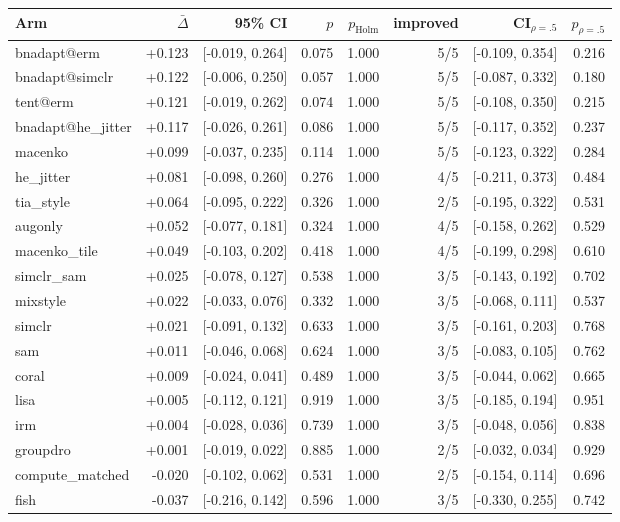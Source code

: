 \begin{tabular}{lrrrrrrr}
\toprule
Arm & $\bar\Delta$ & 95\% CI & $p$ & $p_\text{Holm}$ & improved & CI$_{\rho=.5}$ & $p_{\rho=.5}$ \\
\midrule
bnadapt@erm & +0.123 & [-0.019, 0.264] & 0.075 & 1.000 & 5/5 & [-0.109, 0.354] & 0.216 \\
bnadapt@simclr & +0.122 & [-0.006, 0.250] & 0.057 & 1.000 & 5/5 & [-0.087, 0.332] & 0.180 \\
tent@erm & +0.121 & [-0.019, 0.262] & 0.074 & 1.000 & 5/5 & [-0.108, 0.350] & 0.215 \\
bnadapt@he\_jitter & +0.117 & [-0.026, 0.261] & 0.086 & 1.000 & 5/5 & [-0.117, 0.352] & 0.237 \\
macenko & +0.099 & [-0.037, 0.235] & 0.114 & 1.000 & 5/5 & [-0.123, 0.322] & 0.284 \\
he\_jitter & +0.081 & [-0.098, 0.260] & 0.276 & 1.000 & 4/5 & [-0.211, 0.373] & 0.484 \\
tia\_style & +0.064 & [-0.095, 0.222] & 0.326 & 1.000 & 2/5 & [-0.195, 0.322] & 0.531 \\
augonly & +0.052 & [-0.077, 0.181] & 0.324 & 1.000 & 4/5 & [-0.158, 0.262] & 0.529 \\
macenko\_tile & +0.049 & [-0.103, 0.202] & 0.418 & 1.000 & 4/5 & [-0.199, 0.298] & 0.610 \\
simclr\_sam & +0.025 & [-0.078, 0.127] & 0.538 & 1.000 & 3/5 & [-0.143, 0.192] & 0.702 \\
mixstyle & +0.022 & [-0.033, 0.076] & 0.332 & 1.000 & 3/5 & [-0.068, 0.111] & 0.537 \\
simclr & +0.021 & [-0.091, 0.132] & 0.633 & 1.000 & 3/5 & [-0.161, 0.203] & 0.768 \\
sam & +0.011 & [-0.046, 0.068] & 0.624 & 1.000 & 3/5 & [-0.083, 0.105] & 0.762 \\
coral & +0.009 & [-0.024, 0.041] & 0.489 & 1.000 & 3/5 & [-0.044, 0.062] & 0.665 \\
lisa & +0.005 & [-0.112, 0.121] & 0.919 & 1.000 & 3/5 & [-0.185, 0.194] & 0.951 \\
irm & +0.004 & [-0.028, 0.036] & 0.739 & 1.000 & 3/5 & [-0.048, 0.056] & 0.838 \\
groupdro & +0.001 & [-0.019, 0.022] & 0.885 & 1.000 & 2/5 & [-0.032, 0.034] & 0.929 \\
compute\_matched & -0.020 & [-0.102, 0.062] & 0.531 & 1.000 & 2/5 & [-0.154, 0.114] & 0.696 \\
fish & -0.037 & [-0.216, 0.142] & 0.596 & 1.000 & 3/5 & [-0.330, 0.255] & 0.742 \\
\bottomrule
\end{tabular}
